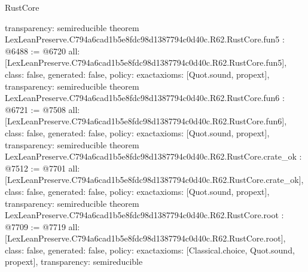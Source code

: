 \begin{lexlean}{RustCore}
\begin{coremodule}
{  transparency: semireducible
}
theorem LexLeanPreserve.C794a6cad1b5e8fdc98d1387794c0d40c.R62.RustCore.fun5 : @6488 := @6720 {
  all: [LexLeanPreserve.C794a6cad1b5e8fdc98d1387794c0d40c.R62.RustCore.fun5],
  class: false,
  generated: false,
  policy: exact{axioms: [Quot.sound, propext]},
  transparency: semireducible
}
theorem LexLeanPreserve.C794a6cad1b5e8fdc98d1387794c0d40c.R62.RustCore.fun6 : @6721 := @7508 {
  all: [LexLeanPreserve.C794a6cad1b5e8fdc98d1387794c0d40c.R62.RustCore.fun6],
  class: false,
  generated: false,
  policy: exact{axioms: [Quot.sound, propext]},
  transparency: semireducible
}
theorem LexLeanPreserve.C794a6cad1b5e8fdc98d1387794c0d40c.R62.RustCore.crate_ok : @7512 := @7701 {
  all: [LexLeanPreserve.C794a6cad1b5e8fdc98d1387794c0d40c.R62.RustCore.crate_ok],
  class: false,
  generated: false,
  policy: exact{axioms: [Quot.sound, propext]},
  transparency: semireducible
}
theorem LexLeanPreserve.C794a6cad1b5e8fdc98d1387794c0d40c.R62.RustCore.root : @7709 := @7719 {
  all: [LexLeanPreserve.C794a6cad1b5e8fdc98d1387794c0d40c.R62.RustCore.root],
  class: false,
  generated: false,
  policy: exact{axioms: [Classical.choice, Quot.sound, propext]},
  transparency: semireducible
}


\end{coremodule}
\end{lexlean}
